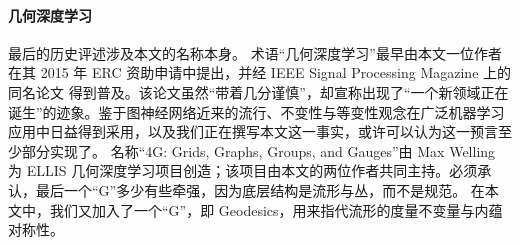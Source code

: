 \paragraph{几何深度学习}
最后的历史评述涉及本文的名称本身。
%
术语“几何深度学习”最早由本文一位作者在其 2015 年 ERC 资助申请中提出，并经 IEEE Signal Processing Magazine 上的同名论文 \citep{bronstein2017geometric} 得到普及。该论文虽然“带着几分谨慎”，却宣称出现了“一个新领域正在诞生”的迹象。鉴于图神经网络近来的流行、不变性与等变性观念在广泛机器学习应用中日益得到采用，以及我们正在撰写本文这一事实，或许可以认为这一预言至少部分实现了。
%
名称“4G: Grids, Graphs, Groups, and Gauges”由 Max Welling 为 ELLIS 几何深度学习项目创造；该项目由本文的两位作者共同主持。必须承认，最后一个“G”多少有些牵强，因为底层结构是流形与丛，而不是规范。
%
在本文中，我们又加入了一个“G”，即 Geodesics，用来指代流形的度量不变量与内蕴对称性。



